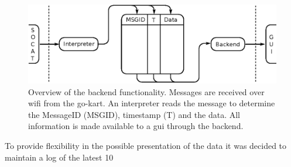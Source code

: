 \begin{figure}
	\includegraphics[width=\linewidth]{graphics/backend_concept}
	\caption[Overview of the backend functionality.]{Overview of the backend functionality. 
	Messages are received over wifi from the go-kart. 
	An interpreter reads the message to determine the MessageID (MSGID), timestamp (T) and the data. 
	All information is made available to a \acs{gui} through the backend.}
	\label{fig:backendconcept}
\end{figure}

To provide flexibility in the possible presentation of the data it was decided to maintain a log of the latest 10